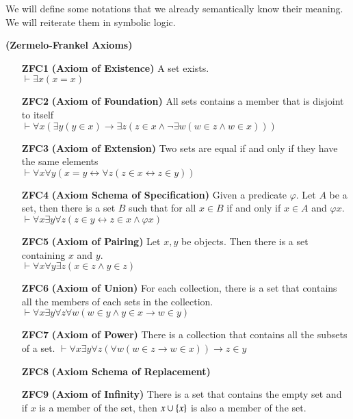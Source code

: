 \newpage
We will define some notations that we already semantically know their meaning. We will reiterate them in symbolic logic.
\begin{ax}
    \textbf{(Zermelo-Frankel Axioms)}
    ~\\
    \begin{itemize}
        \item[\textbf{ZFC1}]\textbf{(Axiom of Existence)} A set exists.\\
        $\vdash \exists x(x=x)$
        \item[\textbf{ZFC2}]\textbf{(Axiom of Foundation)} All sets contains a member that is disjoint to itself\\
        $\vdash \forall x(\exists y(y\in x)\rightarrow \exists z(z\in x\wedge \lnot\exists w(w\in z\wedge w\in x)))$
        \item[\textbf{ZFC3}]\textbf{(Axiom of Extension)} Two sets are equal if and only if they have the same elements\\
        $\vdash \forall x\forall y(x=y\leftrightarrow \forall z(z\in x\leftrightarrow z\in y))$
        \item[\textbf{ZFC4}]\textbf{(Axiom Schema of Specification)} Given a predicate $\varphi$. Let $A$ be a set, then there is a set $B$ such that for all $x\in B$ if and only if $x\in A$ and $\varphi x$.\\
        $\vdash \forall x\exists y\forall z(z\in y\leftrightarrow z\in x\wedge \varphi x)$
        \item[\textbf{ZFC5}]\textbf{(Axiom of Pairing)} Let $x,y$ be objects. Then there is a set containing $x$ and $y$.\\
        $\vdash \forall x\forall y\exists z (x\in z\wedge y\in z)$
        \item[\textbf{ZFC6}]\textbf{(Axiom of Union)} For each collection, there is a set that contains all the members of each sets in the collection.\\
        $\vdash \forall x\exists y \forall z\forall w(w\in y\wedge y\in x\to w\in y)$ 
        \item[\textbf{ZFC7}]\textbf{(Axiom of Power)} There is a collection that contains all the subsets of a set.
        $\vdash \forall x\exists y\forall z (\forall w(w\in z\to w\in x))\to z\in y$
        \item[\textbf{ZFC8}]\textbf{(Axiom Schema of Replacement)}
        \item[\textbf{ZFC9}]\textbf{(Axiom of Infinity)} There is a set that contains the empty set and if $x$ is a member of the set, then $x\cup\{x\}$ is also a member of the set.\\

\end{itemize}
\end{ax}
